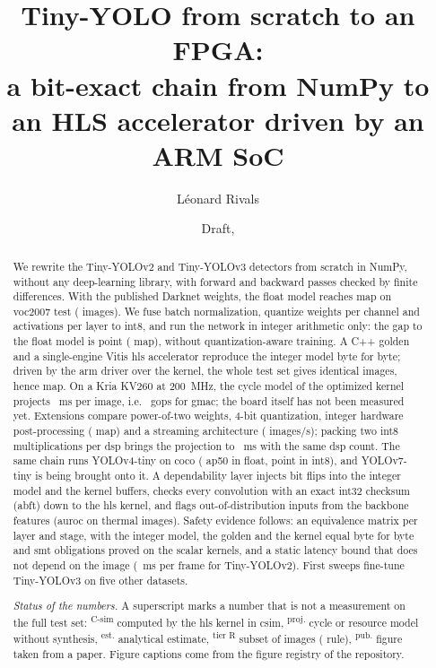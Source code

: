 \documentclass[11pt,a4paper]{article}
\title{Tiny-YOLO from scratch to an FPGA:\\a bit-exact chain from NumPy to an HLS
accelerator driven by an ARM SoC}
\author{Léonard Rivals}
\date{Draft, \articlerev}
\begin{document}
\maketitle

\begin{abstract}
We rewrite the Tiny-YOLOv2 and Tiny-YOLOv3 detectors from scratch in NumPy, without any
deep-learning library, with forward and backward passes checked by finite differences.
With the published Darknet weights, the float model reaches  \gls{map} on
\gls{voc}2007 test ( images). We fuse batch normalization, quantize
weights per channel and activations per layer to \gls{int8}, and run the network in integer
arithmetic only: the gap to the float model is  point
( \gls{map}), without quantization-aware training. A C++ \gls{golden} and
a single-engine Vitis \gls{hls} accelerator reproduce the integer model byte for byte; driven by
the \gls{arm} driver over the  kernel, the whole test set gives
 identical images, hence  \gls{map}. On a Kria
KV260 at 200~MHz, the cycle model of the optimized kernel projects
~ms per image, i.e.\  \gls{gops} for
 \gls{gmac}; the board itself has not been measured yet. Extensions
compare power-of-two weights, 4-bit quantization, integer hardware post-processing
( \gls{map}) and a streaming architecture (
images/s); packing two \gls{int8} multiplications per \gls{dsp} brings the projection to
~ms with the same \gls{dsp} count. The same chain runs YOLOv4-tiny on \gls{coco}
( \gls{ap}50 in float,  point in \gls{int8}), and
YOLOv7-tiny is being brought onto it. A dependability layer injects bit flips into the
integer model and the kernel buffers, checks every convolution with an exact int32 checksum
(\gls{abft}) down to the \gls{hls} kernel, and flags out-of-distribution inputs from the backbone
features (\gls{auroc}  on thermal images). Safety evidence follows:
an equivalence matrix per layer and stage, with the integer model, the \gls{golden} and the
kernel equal byte for byte and  \gls{smt} obligations proved on the
scalar kernels, and a static latency bound that does not depend on the image
(~ms per frame for Tiny-YOLOv2). First sweeps fine-tune
Tiny-YOLOv3 on five other datasets.

\smallskip
\noindent\textit{Status of the numbers.} A superscript marks a number that is not a
measurement on the full test set: \textsuperscript{C-sim} computed by the \gls{hls} kernel in \gls{csim}, \textsuperscript{proj.} cycle or resource model without synthesis,
\textsuperscript{est.} analytical estimate, \textsuperscript{tier R} subset of images
( rule), \textsuperscript{pub.} figure taken from a paper. Figure captions come from
the figure registry of the repository.
\end{abstract}
\end{document}
